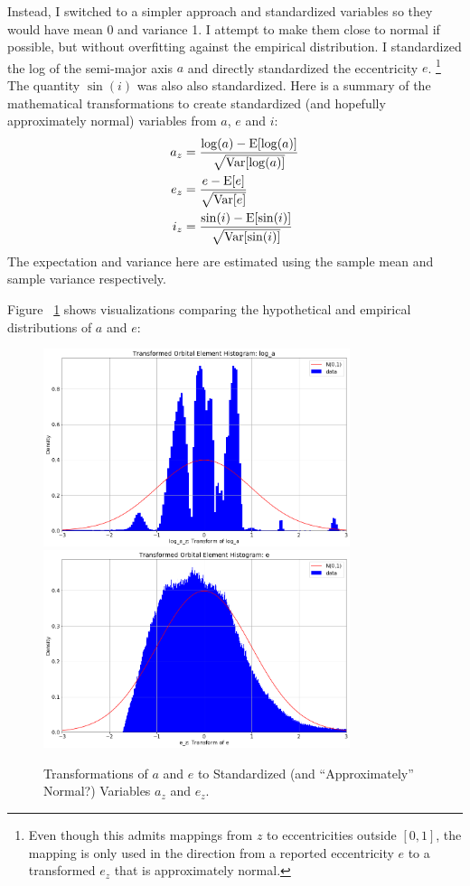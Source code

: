 Instead, I switched to a simpler approach and standardized variables so they would have mean 0 and variance 1.
I attempt to make them close to normal if possible, but without overfitting against the empirical distribution.
I standardized the log of the semi-major axis $a$ and directly standardized the eccentricity $e$.
\footnote{Even though this admits mappings from $z$ to eccentricities outside $[0,1]$, the mapping is only used in the direction
from a reported eccentricity $e$ to a transformed $e_z$ that is approximately normal.}
The quantity $\sin(i)$ was also also standardized.
Here is a summary of the mathematical transformations to create standardized 
(and hopefully approximately normal) variables from $a$, $e$ and $i$:
\begin{align*}
a_z &= \frac{\log(a) - \mathrm{E}[\log(a)]}{\sqrt{\mathrm{Var}[\log(a)]}} \\
e_z &= \frac{e - \mathrm{E}[e]}{\sqrt{\mathrm{Var}[e]}} \\
i_z &= \frac{\sin(i) - \mathrm{E}[\sin(i)]}{\sqrt{\mathrm{Var}[\sin(i)]}}
\end{align*}
The expectation and variance here are estimated using the sample mean and sample variance respectively.

Figure ~\ref{fig:ast_elt_standardize_a_e} shows visualizations comparing the hypothetical and empirical distributions of $a$ and $e$:
\begin{figure}[hbt!]
\begin{center}
\includegraphics[width=0.8\textwidth]{../figs/elts_cov/log_a_z.png}
\includegraphics[width=0.8\textwidth]{../figs/elts_cov/e_z.png}
\end{center}
\caption[Transformations of $a$ and $e$ to Standardized Variables $a_z$ and $e_z$]
{Transformations of $a$ and $e$ to Standardized (and ``Approximately'' Normal?) Variables $a_z$ and $e_z$.}
\label{fig:ast_elt_standardize_a_e}
\end{figure}
\clearpage

